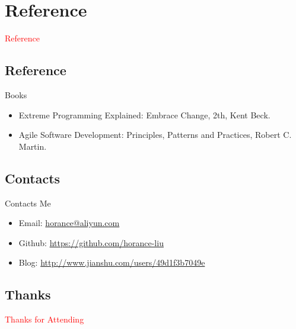 \section{Reference}
\label{sec:reference}

\begin{frame}
  \begin{center}
    \Huge{\textcolor{red}{Reference}}
  \end{center}
\end{frame}

\subsection{Reference}

\begin{frame}{Books}
  \begin{itemize}
    \item \alert{Extreme Programming Explained: Embrace Change, 2th}, Kent Beck.
    \item \alert{Agile Software Development: Principles, Patterns and Practices}, Robert C. Martin.
  \end{itemize}
\end{frame}

\subsection{Contacts}

\begin{frame}{Contacts Me}
    \begin{itemize}
    \item \alert{Email}: \href{horance@aliyun.com}{horance@aliyun.com}
    \item \alert{Github}: \href{https://github.com/horance-liu}{https://github.com/horance-liu} 
    \item \alert{Blog}: \href{http://www.jianshu.com/users/49d1f3b7049e}{http://www.jianshu.com/users/49d1f3b7049e}
    \end{itemize}
\end{frame}

\subsection{Thanks}

\begin{frame}{}
  \begin{center}
    \Huge{\textcolor{red}{Thanks for Attending}}
  \end{center}
\end{frame}

